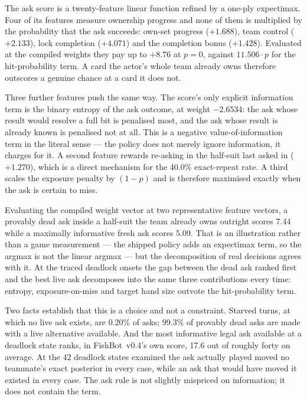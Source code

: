 \documentclass[11pt]{article}
\theoremstyle{definition}
\DeclareRobustCommand{\vfour}{\texorpdfstring{\mbox{FishBot v0.4}}{FishBot v0.4}}
\providecommand{\numRepeatAsk}{40.0}
\providecommand{\numStarved}{0.20}
\providecommand{\numInfoFreeStates}{42}
\providecommand{\numInfoRank}{17.6}
\providecommand{\numHitWeight}{11.506}
\providecommand{\numOwnershipPay}{+8.76}
\providecommand{\numOwnSetWeight}{1.688}
\providecommand{\numTeamControlWeight}{2.133}
\providecommand{\numLockWeight}{4.071}
\providecommand{\numCompletionWeight}{1.428}
\providecommand{\numRepeatWeight}{1.270}
\providecommand{\numEntropyWeight}{-2.6534}
\providecommand{\numDeadScore}{7.44}
\providecommand{\numLiveScore}{5.09}
\providecommand{\numVoluntaryDead}{99.3}
\begin{document}
The ask score is a twenty-feature linear function refined by a one-ply
expectimax. Four of its features measure ownership progress and none of them is
multiplied by the probability that the ask succeeds: own-set progress
($+\numOwnSetWeight$), team control ($+\numTeamControlWeight$), lock completion
($+\numLockWeight$) and the completion bonus ($+\numCompletionWeight$).
Evaluated at the compiled weights they pay up to $\numOwnershipPay$ at $p = 0$,
against $\numHitWeight \cdot p$ for the hit-probability term. A card the actor's whole team already owns
therefore outscores a genuine chance at a card it does not.

Three further features push the same way. The score's only explicit information
term is the binary entropy of the ask outcome, at weight $\numEntropyWeight$: the
ask whose result would resolve a full bit is penalised most, and the ask whose
result is already known is penalised not at all. This is a negative
value-of-information term in the literal sense --- the policy does not merely
ignore information, it charges for it. A second feature rewards re-asking in the
half-suit last asked in ($+\numRepeatWeight$), which is a direct mechanism for the
\numRepeatAsk\% exact-repeat rate. A third scales the exposure penalty by $(1-p)$
and is therefore maximised exactly when the ask is certain to miss.

Evaluating the compiled weight vector at two representative feature vectors, a
provably dead ask inside a half-suit the team already owns outright scores
\numDeadScore{} while a maximally informative fresh ask scores \numLiveScore{}.
That is an illustration rather than a game measurement --- the shipped policy
adds an expectimax term, so the argmax is not the linear argmax --- but the
decomposition of real decisions agrees with it. At the traced deadlock onsets the
gap between the dead ask ranked first and the best live ask decomposes into the
same three contributions every time: entropy, exposure-on-miss and target hand
size outvote the hit-probability term.

Two facts establish that this is a choice and not a constraint. Starved turns,
at which no live ask exists, are \numStarved\% of asks; \numVoluntaryDead\% of
provably dead asks are made with a live alternative available. And the most
informative legal ask available at a deadlock state ranks, in \vfour{}'s own
score, \numInfoRank{} out of roughly forty on average. At the \numInfoFreeStates{}
deadlock states examined the ask actually played moved no teammate's exact
posterior in every case, while an ask that would have moved it existed in every
case. The ask rule is not slightly mispriced on information; it does not contain
the term.
\end{document}
